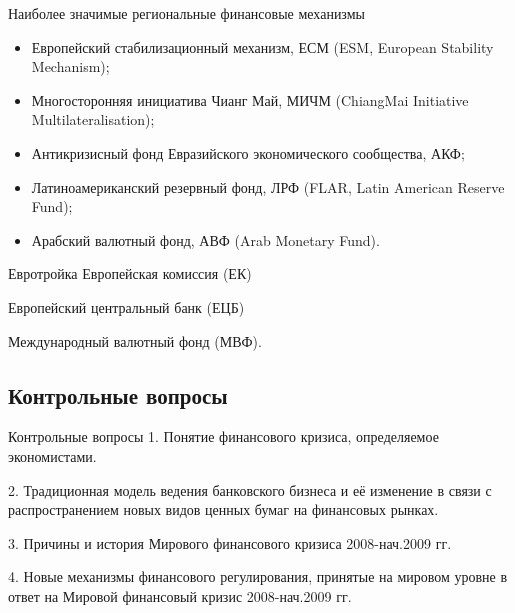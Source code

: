 \documentclass[_Banking_p1.tex]{subfiles}
\begin{document}
\begin{frame}{Наиболее значимые региональные финансовые механизмы}
\begin{itemize}[<+->]

\item
Европейский стабилизационный механизм, ЕСМ (ESM, European Stability Mechanism);

\item
Многосторонняя инициатива Чианг Май, МИЧМ (ChiangMai Initiative Multilateralisation);

\item
Антикризисный фонд Евразийского экономического сообщества, АКФ;

\item
Латиноамериканский резервный фонд, ЛРФ (FLAR, Latin American Reserve Fund);

\item
Арабский валютный фонд, АВФ (Arab Monetary Fund).
\end{itemize}

\end{frame}

\begin{frame}
\begin{block}{Евротройка}
Европейская комиссия (ЕК)

Европейский центральный банк (ЕЦБ) 

Международный валютный фонд (МВФ).
\end{block}
\end{frame}

\subsection{Контрольные вопросы}
\begin{frame}{Контрольные вопросы}
1. Понятие финансового кризиса, определяемое экономистами.

2. Традиционная модель ведения банковского бизнеса и её изменение в связи с распространением новых видов ценных бумаг на финансовых рынках.

3. Причины и история Мирового финансового кризиса 2008-нач.2009 гг.

4. Новые механизмы финансового регулирования, принятые на мировом уровне в ответ на Мировой финансовый кризис 2008-нач.2009 гг.
\end{frame}
\end{document}
